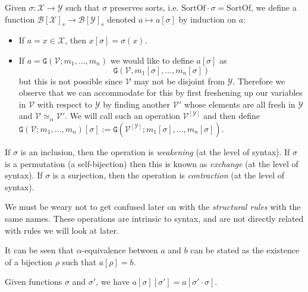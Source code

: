 \begin{defin}\label{sub}
    Given $\sigma : \mathcal{X} \to \mathcal{Y}$ such that $\sigma$ preserves sorts, i.e. $\mathrm{SortOf} \cdot \sigma = \mathrm{SortOf}$, we define a function $\mathcal{B}[\mathcal{X}]_s \to \mathcal{B}[\mathcal{Y}]_s$ denoted $a \mapsto a[\sigma]$ by induction on $a$:
    \begin{itemize}
        \item If $a = x \in \mathcal{X}$, then $x[\sigma] = \sigma(x)$.
        \item If $a = \mathtt{G}(\mathcal{V}; m_1, \dots , m_n)$ we would like to define $a[\sigma]$ as $$\mathtt{G}(\mathcal{V}, m_1[\sigma], \dots, m_n[\sigma])$$ but this is not possible since $\mathcal{V}$ may not be disjoint from $\mathcal{Y}$. Therefore we observe that we can accommodate for this by first freshening up our variables in $\mathcal{V}$ with respect to $\mathcal{Y}$ by finding another $\mathcal{V}'$ whose elements are all fresh in $\mathcal{Y}$ and $\mathcal{V} \simeq_{\alpha}\mathcal{V}'$. We will call such an operation $\mathcal{V}^{[\mathcal{Y}]}$ and then define $\mathtt{G}(\mathcal{V}; m_1 , \dots, m_n)[\sigma] := \mathtt{G}(\mathcal{V}^{[\mathcal{Y}]}; m_1[\sigma], \dots, m_n[\sigma])$. 
    \end{itemize}
    
    If $\sigma$ is an inclusion, then the operation is \emph{weakening} (at the level of syntax).
    If $\sigma$ is a permutation (a self-bijection) then this is known as \emph{exchange} (at the level of syntax).
    If $\sigma$ is a surjection, then the operation is \emph{contraction} (at the level of syntax).
\end{defin}

\begin{remark}
    We must be weary not to get confused later on with the \emph{structural rules} with the same names. These operations are intrinsic to syntax, and are not directly related with rules we will look at later.
\end{remark}

\begin{remark}\label{op_alpha_respect}
    It can be seen that $\alpha$-equivalence between $a$ and $b$ can be stated as the existence of a bijection $\rho$ such that $a[\rho] = b$.
\end{remark}

\begin{lemma}\label{sub_comp}
    Given functions $\sigma$ and $\sigma'$, we have $a[\sigma][\sigma'] = a[\sigma' \cdot \sigma]$.
\end{lemma}

